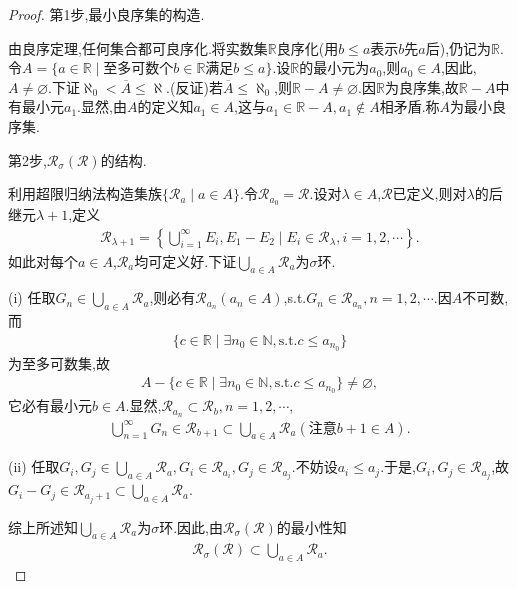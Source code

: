 \documentclass[../../main.tex]{subfiles}%
\begin{document}
\begin{proof}
第1步,最小良序集的构造.

由良序定理,任何集合都可良序化.将实数集$\mathbb{R}$良序化(用$b\leqslant a$表示$b$先$a$后),仍记为$\mathbb{R}$.令$A=\{a\in\mathbb{R}\mid$至多可数个$b\in\mathbb{R}$满足$b\leqslant a\}$.设$\mathbb{R}$的最小元为$a_0$,则$a_0\in A$,因此,$A\neq\varnothing$.下证$\aleph_0<\overline{A}\leqslant\aleph$.(反证)若$\overline{A}\leqslant\aleph_0$,则$\mathbb{R}-A\neq\varnothing$.因$\mathbb{R}$为良序集,故$\mathbb{R}-A$中有最小元$a_1$.显然,由$A$的定义知$a_1\in A$,这与$a_1\in\mathbb{R}-A,a_1\notin A$相矛盾.称$A$为最小良序集.

第2步,$\mathscr{R}_{\sigma}(\mathscr{R})$的结构.

利用超限归纳法构造集族$\{\mathscr{R}_a\mid a\in A\}$.令$\mathscr{R}_{a_0}=\mathscr{R}$.设对$\lambda\in A$,$\mathscr{R}$已定义,则对$\lambda$的后继元$\lambda+1$,定义
\begin{align*}
\mathscr{R}_{\lambda+1}=\left\{\bigcup\limits_{i=1}^{\infty}E_i,E_1-E_2\mid E_i\in\mathscr{R}_{\lambda},i=1,2,\cdots\right\}.
\end{align*}
如此对每个$a\in A$,$\mathscr{R}_a$均可定义好.下证$\bigcup\limits_{a\in A}\mathscr{R}_a$为$\sigma$环.

(i) 任取$G_n\in\bigcup\limits_{a\in A}\mathscr{R}_a$,则必有$\mathscr{R}_{a_n}(a_n\in A)$,s.t.$G_n\in\mathscr{R}_{a_n},n=1,2,\cdots$.因$A$不可数,而
\begin{align*}
\{c\in\mathbb{R}\mid \exists n_0\in\mathbb{N},\text{s.t.}c\leqslant a_{n_0}\}
\end{align*}
为至多可数集,故
\begin{align*}
A-\{c\in\mathbb{R}\mid \exists n_0\in\mathbb{N},\text{s.t.}c\leqslant a_{n_0}\}\neq\varnothing,
\end{align*}
它必有最小元$b\in A$.显然,$\mathscr{R}_{a_n}\subset\mathscr{R}_b,n=1,2,\cdots$,
\begin{align*}
\bigcup\limits_{n=1}^{\infty}G_n\in\mathscr{R}_{b+1}\subset\bigcup\limits_{a\in A}\mathscr{R}_a(\text{注意}b+1\in A).
\end{align*}

(ii) 任取$G_i,G_j\in\bigcup\limits_{a\in A}\mathscr{R}_a,G_i\in\mathscr{R}_{a_i},G_j\in\mathscr{R}_{a_j}$.不妨设$a_i\leqslant a_j$.于是,$G_i,G_j\in\mathscr{R}_{a_j}$,故$G_i-G_j\in\mathscr{R}_{a_j+1}\subset\bigcup\limits_{a\in A}\mathscr{R}_a$.

综上所述知$\bigcup\limits_{a\in A}\mathscr{R}_a$为$\sigma$环.因此,由$\mathscr{R}_{\sigma}(\mathscr{R})$的最小性知
\begin{align*}
\mathscr{R}_{\sigma}(\mathscr{R})\subset\bigcup\limits_{a\in A}\mathscr{R}_a.
\end{align*}


\end{proof}
\end{document}
